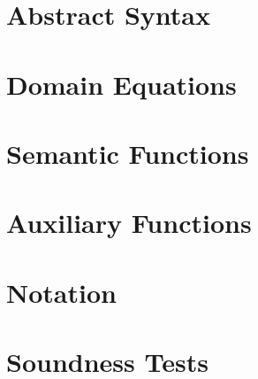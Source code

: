 \documentclass[sigplan,screen]{acmart}
\begin{document}


\clearpage
\onecolumn

\section{Abstract Syntax}


\clearpage

\section{Domain Equations}


\clearpage

\section{Semantic Functions}


\clearpage

\section{Auxiliary Functions}


\clearpage

\appendix 

\section{Notation}



\clearpage

\section{Soundness Tests}

\end{document}
